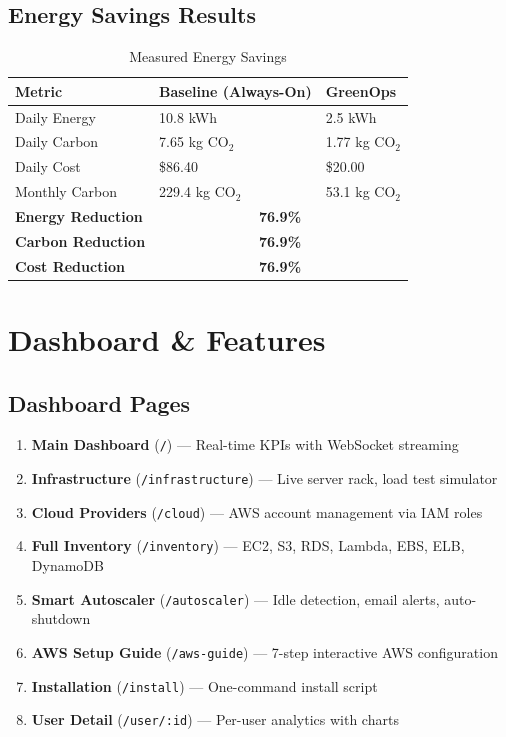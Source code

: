 \documentclass[12pt,a4paper]{report}
\begin{document}
\section{Energy Savings Results}

\begin{table}[H]
\centering
\caption{Measured Energy Savings}
\begin{tabular}{@{}lll@{}}
\toprule
\textbf{Metric} & \textbf{Baseline (Always-On)} & \textbf{GreenOps} \\
\midrule
Daily Energy & 10.8 kWh & 2.5 kWh \\
Daily Carbon & 7.65 kg CO$_2$ & 1.77 kg CO$_2$ \\
Daily Cost & \$86.40 & \$20.00 \\
Monthly Carbon & 229.4 kg CO$_2$ & 53.1 kg CO$_2$ \\
\midrule
\textbf{Energy Reduction} & \multicolumn{2}{c}{\textbf{76.9\%}} \\
\textbf{Carbon Reduction} & \multicolumn{2}{c}{\textbf{76.9\%}} \\
\textbf{Cost Reduction} & \multicolumn{2}{c}{\textbf{76.9\%}} \\
\bottomrule
\end{tabular}
\end{table}

\chapter{Dashboard \& Features}

\section{Dashboard Pages}

\begin{enumerate}
    \item \textbf{Main Dashboard} (\texttt{/}) --- Real-time KPIs with WebSocket streaming
    \item \textbf{Infrastructure} (\texttt{/infrastructure}) --- Live server rack, load test simulator
    \item \textbf{Cloud Providers} (\texttt{/cloud}) --- AWS account management via IAM roles
    \item \textbf{Full Inventory} (\texttt{/inventory}) --- EC2, S3, RDS, Lambda, EBS, ELB, DynamoDB
    \item \textbf{Smart Autoscaler} (\texttt{/autoscaler}) --- Idle detection, email alerts, auto-shutdown
    \item \textbf{AWS Setup Guide} (\texttt{/aws-guide}) --- 7-step interactive AWS configuration
    \item \textbf{Installation} (\texttt{/install}) --- One-command install script
    \item \textbf{User Detail} (\texttt{/user/:id}) --- Per-user analytics with charts
\end{enumerate}
\end{document}
